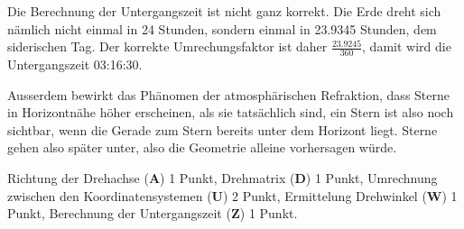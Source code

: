 \begin{diskussion}
Die Berechnung der Untergangszeit ist nicht ganz korrekt. Die Erde dreht
sich nämlich nicht einmal in 24 Stunden, sondern einmal in 23.9345 Stunden,
dem siderischen Tag.
Der korrekte Umrechungsfaktor ist daher $\frac{23.9245}{360}$, damit
wird die Untergangszeit 03:16:30.

Ausserdem bewirkt das Phänomen der atmosphärischen Refraktion, dass
Sterne in Horizontnähe höher erscheinen, als sie tatsächlich
sind, ein Stern ist also noch sichtbar, wenn die Gerade zum Stern bereits
unter dem Horizont liegt.
Sterne gehen also später unter, also die Geometrie alleine vorhersagen
würde.
\end{diskussion}

\begin{bewertung}
Richtung der Drehachse (\textbf{A}) 1 Punkt,
Drehmatrix (\textbf{D}) 1 Punkt,
Umrechnung zwischen den Koordinatensystemen (\textbf{U}) 2 Punkt,
Ermittelung Drehwinkel (\textbf{W}) 1 Punkt,
Berechnung der Untergangszeit (\textbf{Z}) 1 Punkt.
\end{bewertung}

